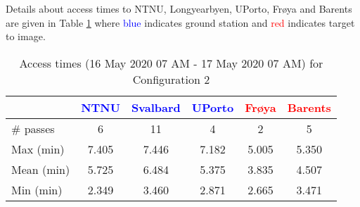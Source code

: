Details about access times to NTNU, Longyearbyen, UPorto, Fr{\o}ya and Barents are given in Table \ref{tab:revisit_2} where \textcolor{blue}{blue} indicates ground station and \textcolor{red}{red} indicates target to image.
\begin{table}[htbp]
	\caption{Access times (16 May 2020 07 AM - 17 May 2020 07 AM) for Configuration 2}
	\label{tab:revisit_2}
	\centering
		\begin{tabular}{|l|c|c|c|c|c|}
			\hline
			 & \textcolor{blue}{NTNU} & \textcolor{blue}{Svalbard} & \textcolor{blue}{UPorto}  &  \textcolor{red}{Fr{\o}ya} & \textcolor{red}{Barents} \\
					\hline
			\# passes & 6 & 11 & 4 & 2 & 5 \\
			Max (min) & 7.405 & 7.446 & 7.182 & 5.005 & 5.350 \\
			Mean (min) 	&	5.725	&	6.484 & 5.375 & 3.835 & 4.507  		\\
			Min (min) & 2.349 & 3.460 & 2.871 & 2.665 & 3.471 \\
			\hline
		\end{tabular}
\end{table}

